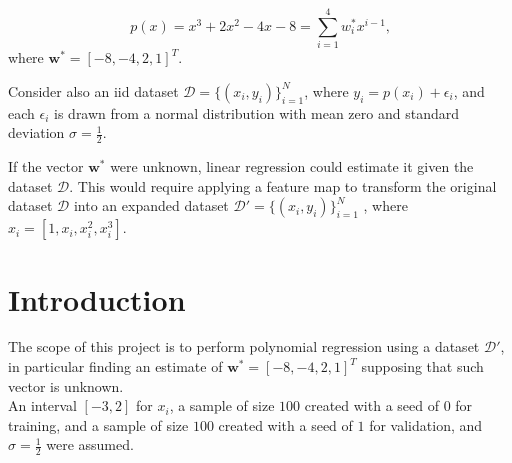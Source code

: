 \documentclass[a4paper,12pt]{article} %
\begin{document}
	

	\thispagestyle{empty}  
	\vspace{0.4cm}

	
	
	\begin{equation*}
	p(x)=x^3+2x^2-4x-8=\sum_{i=1}^4 w_i^*x^{i-1} \mbox{,}
	\end{equation*} 
	where $\textbf{w}^*=[-8,-4,2,1]^T$.
	
	Consider also an iid dataset $\mathcal{D} = \{(x_i, y_i)\}^N_{i=1}$, where 
	$y_i = p(x_i)+\epsilon_i$, and each $\epsilon_i$ is drawn from a normal 
	distribution with mean zero and standard deviation $\sigma = \frac{1}{2}$.
	
	If the vector $\textbf{w}^*$ were unknown, linear regression could estimate it given the dataset $\mathcal{D}$. This would require applying a feature map to transform the
	original dataset $\mathcal{D}$ into an expanded dataset $\mathcal{D}'= \{(x_i, y_i)\}^N_{i=1}$ , where $x_i = [1,x_i,x_i^2,x_i^3]$.
	
	\section{Introduction}
	The scope of this {project} is to perform polynomial regression using a dataset $\mathcal{D}'$, in particular finding an estimate of $\textbf{w}^*=[-8,-4,2,1]^T$ supposing that such vector is unknown.\\
	An interval $[-3, 2]$ for $x_i$, a sample of size $100$ created with a seed of $0$ for training, and a sample of size $100$ created with a seed of $1$ for validation, and $\sigma = \frac{1}{2}$ were assumed.
	
\end{document}
